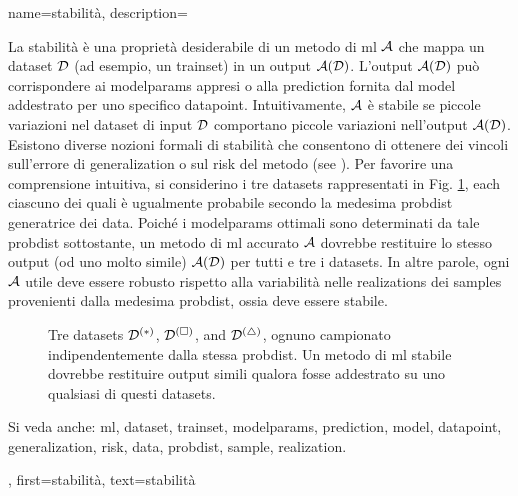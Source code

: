 {name={stabilità},
	description={La stabilità è una proprietà desiderabile di un metodo di \gls{ml} $\mathcal{A}$ 
	che mappa un 
		\gls{dataset} $\mathcal{D}$ (ad esempio, un \gls{trainset}) in un output $\mathcal{A}(\mathcal{D})$. L'output
		$\mathcal{A}(\mathcal{D})$ può corrispondere ai \glspl{modelparam} appresi o alla \gls{prediction} fornita 
		dal \gls{model} addestrato per uno specifico \gls{datapoint}. Intuitivamente, $\mathcal{A}$ è stabile se 
		piccole variazioni nel \gls{dataset} di input $\mathcal{D}$ comportano piccole variazioni nell’output 
		$\mathcal{A}(\mathcal{D})$. Esistono diverse nozioni formali di stabilità che consentono di ottenere dei 
		vincoli sull’errore di \gls{generalization} o sul \gls{risk} del metodo (see \cite[Ch.~13]{ShalevMLBook}).
		Per favorire una comprensione intuitiva, si considerino i tre \glspl{dataset} rappresentati in Fig. 
		\ref{fig_three_data_stability_dict}, each 
		ciascuno dei quali è ugualmente probabile secondo la medesima \gls{probdist} generatrice dei 
		\gls{data}. Poiché i \glspl{modelparam} ottimali sono determinati da tale \gls{probdist} sottostante, un 
		metodo di \gls{ml} accurato $\mathcal{A}$ dovrebbe restituire lo stesso output (od uno molto simile) 
		$\mathcal{A}(\mathcal{D})$ 
		per tutti e tre i \glspl{dataset}. In altre parole, ogni $\mathcal{A}$ utile deve essere robusto rispetto alla 
		variabilità nelle \glspl{realization} dei \glspl{sample} provenienti dalla medesima \gls{probdist}, ossia 
		deve essere stabile.		
		\begin{figure}[H]
			\centering
			\caption{Tre \glspl{dataset} $\mathcal{D}^{(*)}$, $\mathcal{D}^{(\square)}$, and $\mathcal{D}^{(\triangle)}$, 
				ognuno campionato indipendentemente dalla stessa \gls{probdist}. Un metodo di \gls{ml} 
				stabile dovrebbe restituire output simili qualora fosse addestrato su uno qualsiasi di questi 
				\glspl{dataset}. \label{fig_three_data_stability_dict}}
		\end{figure}
		Si veda anche: \gls{ml}, \gls{dataset}, \gls{trainset}, \glspl{modelparam}, \gls{prediction}, \gls{model}, \gls{datapoint}, \gls{generalization}, \gls{risk}, \gls{data}, \gls{probdist}, \gls{sample}, \gls{realization}.}, 
	first={stabilità}, 
	text={stabilità} 
}


